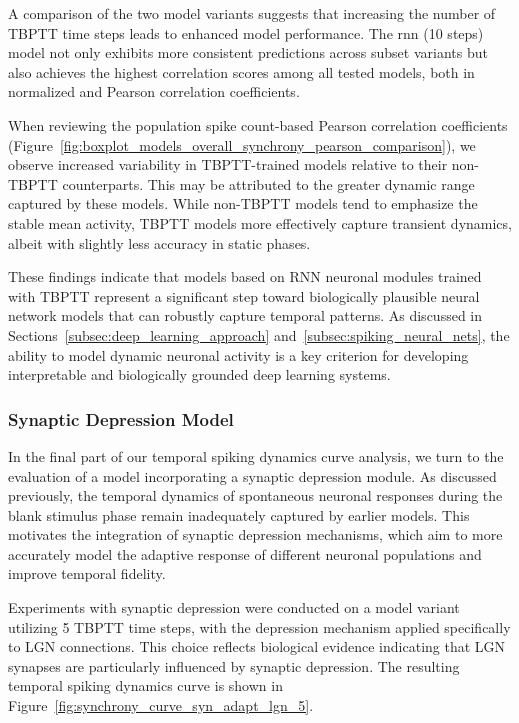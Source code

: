 A comparison of the two model variants suggests that increasing the number of TBPTT time steps leads to enhanced model performance. The rnn (10 steps) model not only exhibits more consistent predictions across subset variants but also achieves the highest correlation scores among all tested models, both in normalized and Pearson correlation coefficients.

When reviewing the population spike count-based Pearson correlation coefficients (Figure~\ref{fig:boxplot_models_overall_synchrony_pearson_comparison}), we observe increased variability in TBPTT-trained models relative to their non-TBPTT counterparts. This may be attributed to the greater dynamic range captured by these models. While non-TBPTT models tend to emphasize the stable mean activity, TBPTT models more effectively capture transient dynamics, albeit with slightly less accuracy in static phases.

These findings indicate that models based on RNN neuronal modules trained with TBPTT represent a significant step toward biologically plausible neural network models that can robustly capture temporal patterns. As discussed in Sections~\ref{subsec:deep_learning_approach} and~\ref{subsec:spiking_neural_nets}, the ability to model dynamic neuronal activity is a key criterion for developing interpretable and biologically grounded deep learning systems.

\subsubsection{Synaptic Depression Model}
\label{{subsubsec:syn_adap_lgn_5}}

In the final part of our temporal spiking dynamics curve analysis, we turn to the evaluation of a model incorporating a synaptic depression module. As discussed previously, the temporal dynamics of spontaneous neuronal responses during the blank stimulus phase remain inadequately captured by earlier models. This motivates the integration of synaptic depression mechanisms, which aim to more accurately model the adaptive response of different neuronal populations and improve temporal fidelity.

Experiments with synaptic depression were conducted on a model variant utilizing 5 TBPTT time steps, with the depression mechanism applied specifically to LGN connections. This choice reflects biological evidence indicating that LGN synapses are particularly influenced by synaptic depression. The resulting temporal spiking dynamics curve is shown in Figure~\ref{fig:synchrony_curve_syn_adapt_lgn_5}.

